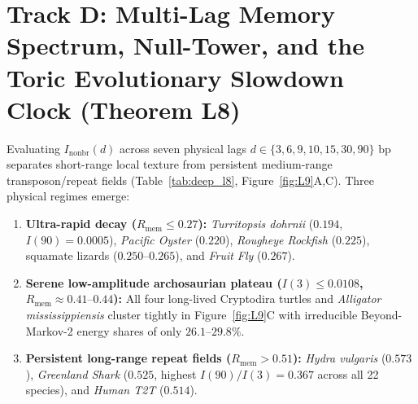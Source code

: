 \documentclass[11pt,a4paper]{article}
\renewcommand{\_}{\origunderscore\penalty200\relax}
\theoremstyle{remark}
\begin{document}
\section{Track D: Multi-Lag Memory Spectrum, Null-Tower, and the Toric Evolutionary Slowdown Clock (Theorem L8)}
Evaluating $I_{\mathrm{nonbr}}(d)$ across seven physical lags $d \in \{3, 6, 9, 10, 15, 30, 90\}\text{ bp}$ separates short-range local texture from persistent medium-range transposon/repeat fields (Table~\ref{tab:deep_l8}, Figure~\ref{fig:L9}A,C).
Three physical regimes emerge:
\begin{enumerate}
  \item \textbf{Ultra-rapid decay ($R_{\mathrm{mem}} \le 0.27$):} \textit{Turritopsis dohrnii} ($0.194$, $I(90)=0.0005$), \textit{Pacific Oyster} ($0.220$), \textit{Rougheye Rockfish} ($0.225$), squamate lizards ($0.250\text{--}0.265$), and \textit{Fruit Fly} ($0.267$).
  \item \textbf{Serene low-amplitude archosaurian plateau ($I(3) \le 0.0108$, $R_{\mathrm{mem}} \approx 0.41\text{--}0.44$):} All four long-lived Cryptodira turtles and \textit{Alligator mississippiensis} cluster tightly in Figure~\ref{fig:L9}C with irreducible Beyond-Markov-2 energy shares of only $26.1\text{--}29.8\%$.
  \item \textbf{Persistent long-range repeat fields ($R_{\mathrm{mem}} > 0.51$):} \textit{Hydra vulgaris} ($0.573$), \textit{Greenland Shark} ($0.525$, highest $I(90)/I(3) = 0.367$ across all 22 species), and \textit{Human T2T} ($0.514$).
\end{enumerate}
\end{document}
